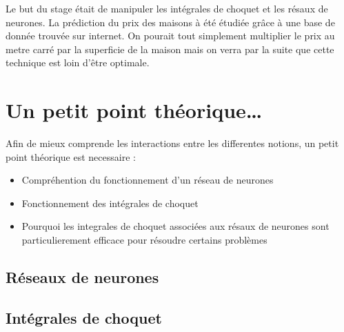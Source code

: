 
Le but du stage était de manipuler les intégrales de choquet et les résaux de neurones.
La prédiction du prix des maisons à été étudiée grâce à une base de donnée trouvée sur internet\cite{houses}.
On pourait tout simplement multiplier le prix au metre carré par la superficie de la maison
mais on verra par la suite que cette technique est loin d'être optimale.


\section{Un petit point théorique\ldots}
\label{sec:th}
Afin de mieux comprende les interactions entre les differentes notions,
un petit point théorique est necessaire :
\begin{itemize}
    \item Compréhention du fonctionnement d'un réseau de neurones
    \item Fonctionnement des intégrales de choquet
    \item Pourquoi les integrales de choquet associées aux résaux de neurones sont particulierement efficace pour résoudre certains problèmes
\end{itemize}

\subsection{Réseaux de neurones}\label{subsec:réseau-de-neurones}


\newpage


\subsection{Intégrales de choquet}\label{subsec:intégrales-de-choquet}

